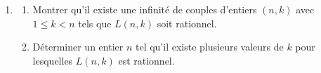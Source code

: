 \documentclass[landscape,twocolumn,leqno,a4paper,10pt]{report} %
\renewcommand{\leq}{\leqslant}
\begin{document}
\begin{enumerate}
\begin{enumerate}
		Montrer que $p_{s}>s$ et que $p_{s}$ est somme de deux carrés.
		\item En déduire qu'il existe une infinité de nombres premiers somme de deux carrés.
	\end{enumerate}
	\item \begin{enumerate}
		\item Montrer qu'il existe une infinité de couples d'entiers $(n, k)$ avec $1 \leq k<n$ tels que $L(n, k)$ soit rationnel.
		\item Déterminer un entier $n$ tel qu'il existe plusieurs valeurs de $k$ pour lesquelles $L(n, k)$ est rationnel.
	\end{enumerate}
\end{enumerate}
\end{document}
